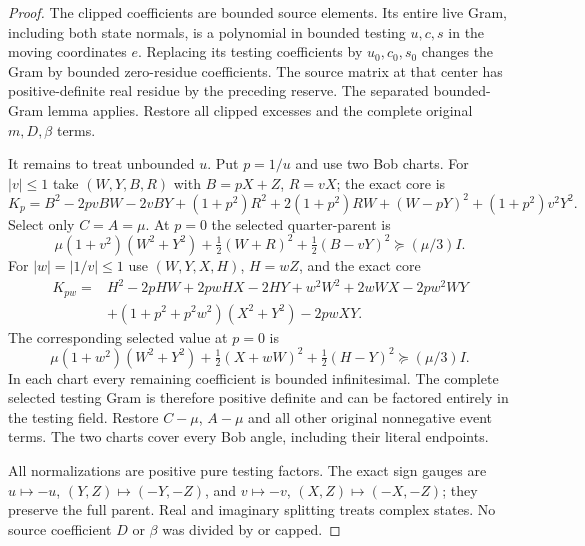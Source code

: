 \begin{proof}
The clipped coefficients are bounded source elements. Its entire
live Gram, including both state normals, is a polynomial in bounded
testing $u,c,s$ in the moving coordinates $e$. Replacing its testing
coefficients by $u_0,c_0,s_0$ changes the Gram by bounded zero-residue
coefficients. The source matrix at that center has positive-definite
real residue by the preceding reserve.
The separated bounded-Gram lemma applies. Restore all clipped
excesses and the complete original $m,D,\beta$ terms.

It remains to treat unbounded $u$. Put $p=1/u$ and use two Bob charts.
For $|v|\le1$ take $(W,Y,B,R)$ with $B=pX+Z$, $R=vX$; the exact core is
\[
 K_p=B^2-2pvBW-2vBY+(1+p^2)R^2+2(1+p^2)RW
                         +(W-pY)^2+(1+p^2)v^2Y^2.
\]
Select only $C=A=\mu$. At $p=0$ the selected quarter-parent is
\[
 \mu(1+v^2)(W^2+Y^2)+\tfrac12(W+R)^2
                             +\tfrac12(B-vY)^2\succeq(\mu/3)I.
\]
For $|w|=|1/v|\le1$ use $(W,Y,X,H)$, $H=wZ$, and the exact core
\begin{align*}
 K_{pw}={}&H^2-2pHW+2pwHX-2HY+w^2W^2+2wWX-2pw^2WY\\
 &+(1+p^2+p^2w^2)(X^2+Y^2)-2pwXY.
\end{align*}
The corresponding selected value at $p=0$ is
\[
 \mu(1+w^2)(W^2+Y^2)+\tfrac12(X+wW)^2
                               +\tfrac12(H-Y)^2\succeq(\mu/3)I.
\]
In each chart every remaining coefficient is bounded infinitesimal.
The complete selected testing Gram is therefore positive definite
and can be factored entirely in the testing field. Restore $C-\mu$,
$A-\mu$ and all other original nonnegative event terms. The two
charts cover every Bob angle, including their literal endpoints.

All normalizations are positive pure testing factors. The exact
sign gauges are $u\mapsto-u$, $(Y,Z)\mapsto(-Y,-Z)$, and
$v\mapsto-v$, $(X,Z)\mapsto(-X,-Z)$; they preserve the full parent.
Real and imaginary splitting treats complex states. No source
coefficient $D$ or $\beta$ was divided by or capped.
\end{proof}
